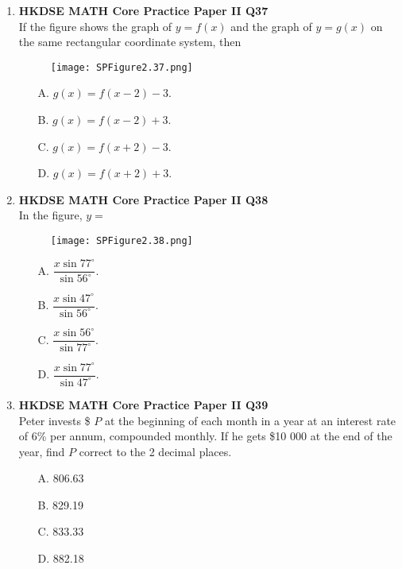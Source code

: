 \documentclass[12pt]{article}
\begin{document}
\begin{enumerate}
	\item \textbf{HKDSE MATH Core Practice Paper II Q37}\\
	If the figure shows the graph of $y = f(x)$ and the graph of $y = g(x)$ on the same rectangular coordinate system, then
	\begin{figure}[H]
		\centering
		\texttt{[image: SPFigure2.37.png]}	
	\end{figure}
	\begin{enumerate}
		\item[A.] $g(x) = f(x - 2) - 3$.
		\item[B.] $g(x) = f(x - 2) + 3$.
		\item[C.] $g(x) = f(x + 2) - 3$.
		\item[D.] $g(x) = f(x + 2) + 3$.
	\end{enumerate}
	
	\item \textbf{HKDSE MATH Core Practice Paper II Q38}\\
	In the figure, $y = $
	\begin{figure}[H]
		\centering
		\texttt{[image: SPFigure2.38.png]}	
	\end{figure}
	\begin{enumerate}
		\item[A.] $\dfrac{x\sin{77^\circ}}{\sin{56^\circ}}$.
		\item[B.] $\dfrac{x\sin{47^\circ}}{\sin{56^\circ}}$.
		\item[C.] $\dfrac{x\sin{56^\circ}}{\sin{77^\circ}}$.
		\item[D.] $\dfrac{x\sin{77^\circ}}{\sin{47^\circ}}$.
	\end{enumerate}
	
	\item \textbf{HKDSE MATH Core Practice Paper II Q39}\\
	Peter invests \$ $P$ at the beginning of each month in a year at an interest rate of 6\% per annum, compounded monthly. If he gets \$10 000 at the end of the year, find $P$ correct to the 2 decimal places.
	\begin{enumerate}
		\item[A.] 806.63
		\item[B.] 829.19
		\item[C.] 833.33
		\item[D.] 882.18
	\end{enumerate}
	

\end{enumerate}
\end{document}
